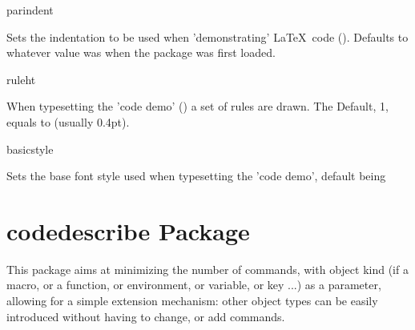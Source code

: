 \documentclass{article}
\begin{document}
\begin{codedescribe}[key]{parindent}
\begin{codesyntax} %
\end{codesyntax}
Sets the indentation to be used when 'demonstrating' \LaTeX\ code (\tsobj[code]{\tsdemo}). Defaults to whatever value \tsobj[code]{\parindent} was when the package was first loaded.
\end{codedescribe}

\begin{codedescribe}[key]{ruleht}%
\begin{codesyntax} %
\end{codesyntax}
When typesetting the 'code demo' (\tsobj{\tsdemo}) a set of rules are drawn. The Default, 1, equals to \tsobj{\arrayrulewidth} (usually 0.4pt).
\end{codedescribe}

\begin{codedescribe}[key,new=2023/11/18]{basicstyle}%
\begin{codesyntax} %
\end{codesyntax}
Sets the base font style used when typesetting the 'code demo', default being \tsobj{\footnotesize} \tsobj{\ttfamily}
\end{codedescribe}


\section{codedescribe Package}

This package aims at minimizing the number of commands, with object kind (if a macro, or a function, or environment, or variable, or key ...) as a parameter, allowing for a simple extension mechanism: other object types can be easily introduced without having to change, or add commands.
\end{document}
